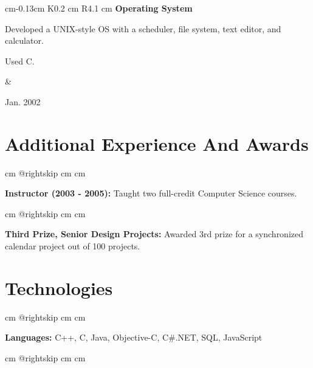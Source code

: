 \vspace{0.2 cm}
\begin{tabularx}{
     cm-0.13cm
}{
    K{0.2 cm}
    R{4.1 cm}
}
    \textbf{Operating System}

    \vspace{0.10 cm}

    \begin{highlights}
        \item Developed a UNIX-style OS with a scheduler, file system, text editor, and calculator.
        \item Used C.
    \end{highlights}
    &
    

    Jan. 2002
\end{tabularx}




\section{Additional Experience And Awards}

\begingroup{} cm
\advance\csname @rightskip cm
\advance{} cm

\textbf{Instructor (2003 - 2005):} Taught two full-credit Computer Science courses. \par\endgroup

\vspace{0.2 cm}
\begingroup{} cm
\advance\csname @rightskip cm
\advance{} cm

\textbf{Third Prize, Senior Design Projects:} Awarded 3rd prize for a synchronized calendar project out of 100 projects. \par\endgroup



\section{Technologies}

\begingroup{} cm
\advance\csname @rightskip cm
\advance{} cm

\textbf{Languages:} C++, C, Java, Objective-C, C\#.NET, SQL, JavaScript \par\endgroup

\vspace{0.2 cm}
\begingroup{} cm
\advance\csname @rightskip cm
\advance{} cm


